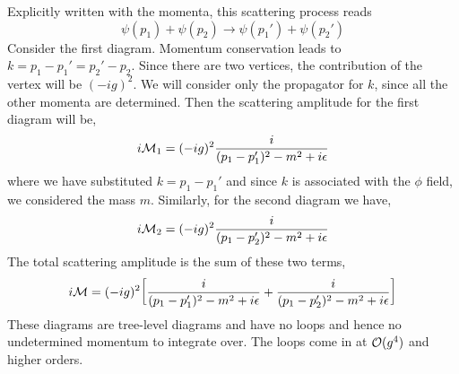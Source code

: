 Explicitly written with the momenta, this scattering process reads $$\psi(p_1)+\psi(p_2)\longrightarrow \psi(p_1')+\psi(p_2')$$
Consider the first diagram. Momentum conservation leads to $k = p_1-p_1'= p_2'-p_2$. Since there are two vertices, the contribution of the vertex will be $(-ig)^2$. We will consider only the propagator for $k$, since all the other momenta are determined. Then the scattering amplitude for the first diagram will be,
$$i\mathcal M_1 = (-ig)^2 \frac{i}{(p_1-p_1')^2-m^2+i\epsilon}$$
where we have substituted $k =p_1-p_1'$ and since $k$ is associated with the $\phi$ field, we considered the mass $m$. Similarly, for the second diagram we have, 
$$i\mathcal M_2 = (-ig)^2 \frac{i}{(p_1-p_2')^2-m^2+i\epsilon}$$
The total scattering amplitude is the sum of these two terms, 
$$i\mathcal M = (-ig)^2\qty[\frac{i}{(p_1-p_1')^2-m^2+i\epsilon}+\frac{i}{(p_1-p_2')^2-m^2+i\epsilon}]$$
These diagrams are tree-level diagrams and have no loops and hence no undetermined momentum to integrate over. The loops come in at $\mathcal O(g^4)$ and higher orders. 
